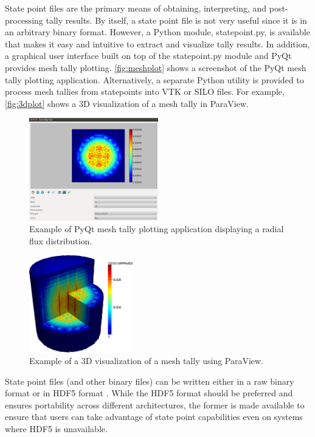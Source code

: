 \documentclass{snamc2013}
\begin{document}
State point files are the primary means of obtaining, interpreting, and
post-processing tally results.  By itself, a state point file is not very useful
since it is in an arbitrary binary format. However, a Python module,
statepoint.py, is available that makes it easy and intuitive to extract and
visualize tally results. In addition, a graphical user interface built on top of
the statepoint.py module and PyQt provides mesh tally
plotting. \autoref{fig:meshplot} shows a screenshot of the PyQt mesh tally
plotting application. Alternatively, a separate Python utility is provided to
process mesh tallies from statepoints into VTK or SILO files.  For example,
\autoref{fig:3dplot} shows a 3D visualization of a mesh tally in ParaView.
\begin{figure}[htb]
  \centering
  \includegraphics[width=0.5\textwidth]{images/plotmeshtally.png}
  \caption{Example of PyQt mesh tally plotting application displaying a radial
    flux distribution.}
  \label{fig:meshplot}
\end{figure}
\begin{figure}[htb]
  \centering
  \includegraphics[width=0.4\textwidth]{images/tallyplot.png}
  \caption{Example of a 3D visualization of a mesh tally using ParaView.}
  \label{fig:3dplot}
\end{figure}

State point files (and other binary files) can be written either in a raw binary
format or in HDF5 format \cite{hdf5-koranne-2011}. While the HDF5 format should
be preferred and ensures portability across different architectures, the former
is made available to ensure that users can take advantage of state point
capabilities even on systems where HDF5 is unavailable.
\end{document}

